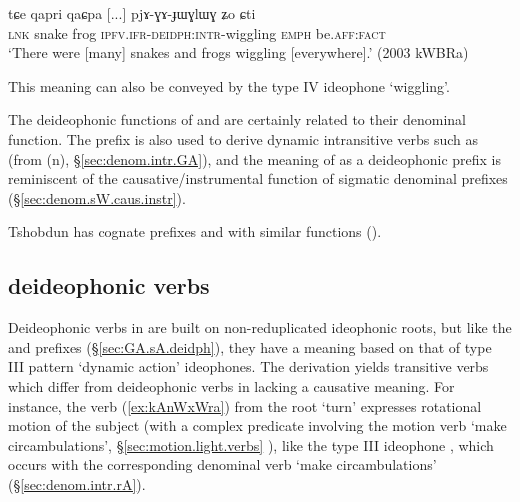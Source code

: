\begin{exe}
\ex \label{ex:pjAGAJWGLWG}
\gll   tɕe qapri qaɕpa [...] pjɤ-ɣɤ-ɟɯɣlɯɣ ʑo ɕti \\
\textsc{lnk} snake frog { } \textsc{ipfv}.\textsc{ifr}-\textsc{deidph}:\textsc{intr}-wiggling \textsc{emph} be.\textsc{aff}:\textsc{fact} \\
\glt `There were [many] snakes and frogs wiggling [everywhere].' (2003 kWBRa)
\end{exe}


This meaning can also be conveyed by the type IV ideophone  `wiggling'.


The deideophonic functions of  and  are certainly related to their denominal function. The prefix  is also used to derive dynamic intransitive verbs such as  (from  (n), §\ref{sec:denom.intr.GA}), and the meaning of  as a deideophonic prefix is reminiscent of the causative/instrumental function of sigmatic denominal prefixes (§\ref{sec:denom.sW.caus.instr}).

Tshobdun has cognate prefixes  and  with similar functions (\citealt{jackson04zhuangmaoci, jackson14morpho}).

\subsection{ deideophonic verbs} \label{sec:nW.deidph}
Deideophonic verbs in  are built on non-reduplicated ideophonic roots, but like the  and  prefixes (§\ref{sec:GA.sA.deidph}), they have a meaning based on that of type III pattern `dynamic action' ideophones. The  derivation yields  transitive verbs which differ from  deideophonic verbs in lacking a causative meaning. For instance, the verb  (\ref{ex:kAnWxWra}) from the root  `turn' expresses rotational motion of the subject (with a complex predicate involving the motion verb  `make circambulations', §\ref{sec:motion.light.verbs}
), like the type III ideophone , which occurs with the corresponding denominal verb  `make circambulations' (§\ref{sec:denom.intr.rA}).

